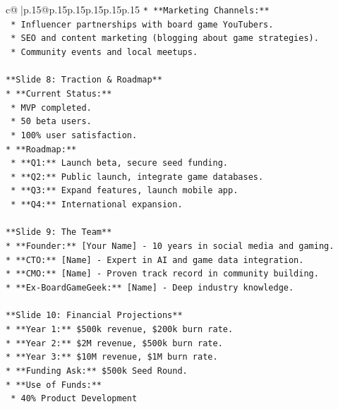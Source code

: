 \documentclass{article}
\begin{document}
{\begin{supertabular}{c@{$\;$}|p{.15\linewidth}@{}p{.15\linewidth}p{.15\linewidth}p{.15\linewidth}p{.15\linewidth}p{.15\linewidth}}
{{{\texttt{*   **Marketing Channels:**} \\
\texttt{    *   Influencer partnerships with board game YouTubers.} \\
\texttt{    *   SEO and content marketing (blogging about game strategies).} \\
\texttt{    *   Community events and local meetups.} \\
\\ 
\texttt{**Slide 8: Traction \& Roadmap**} \\
\texttt{*   **Current Status:**} \\
\texttt{    *   MVP completed.} \\
\texttt{    *   50 beta users.} \\
\texttt{    *   100\% user satisfaction.} \\
\texttt{*   **Roadmap:**} \\
\texttt{    *   **Q1:** Launch beta, secure seed funding.} \\
\texttt{    *   **Q2:** Public launch, integrate game databases.} \\
\texttt{    *   **Q3:** Expand features, launch mobile app.} \\
\texttt{    *   **Q4:** International expansion.} \\
\\ 
\texttt{**Slide 9: The Team**} \\
\texttt{*   **Founder:** {[}Your Name{]} {-} 10 years in social media and gaming.} \\
\texttt{*   **CTO:** {[}Name{]} {-} Expert in AI and game data integration.} \\
\texttt{*   **CMO:** {[}Name{]} {-} Proven track record in community building.} \\
\texttt{*   **Ex{-}BoardGameGeek:** {[}Name{]} {-} Deep industry knowledge.} \\
\\ 
\texttt{**Slide 10: Financial Projections**} \\
\texttt{*   **Year 1:** \$500k revenue, \$200k burn rate.} \\
\texttt{*   **Year 2:** \$2M revenue, \$500k burn rate.} \\
\texttt{*   **Year 3:** \$10M revenue, \$1M burn rate.} \\
\texttt{*   **Funding Ask:** \$500k Seed Round.} \\
\texttt{*   **Use of Funds:**} \\
\texttt{    *   40\% Product Development} \\
}}}
\end{supertabular}}
\end{document}
